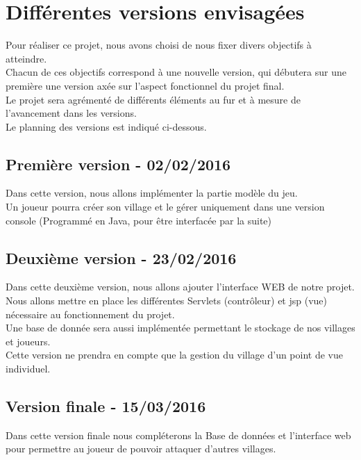 \chapter{Différentes versions envisagées}
	
	Pour réaliser ce projet, nous avons choisi de nous fixer divers objectifs à atteindre.\\
    Chacun de ces objectifs correspond à une nouvelle version, qui débutera sur une première une version axée sur l'aspect fonctionnel du projet final.\\
    Le projet sera agrémenté de différents éléments au fur et à mesure de l'avancement dans les versions.\\

    Le planning des versions est indiqué ci-dessous.
	
    \section{Première version - 02/02/2016}
    Dans cette version, nous allons implémenter la partie modèle du jeu.\\
    Un joueur pourra créer son village et le gérer uniquement dans une version console (Programmé en Java, pour être interfacée par la suite)
    
    \section{Deuxième version - 23/02/2016}
    Dans cette deuxième version, nous allons ajouter l'interface WEB de notre projet.\\
    Nous allons mettre en place les différentes Servlets (contrôleur) et jsp (vue) nécessaire au fonctionnement du projet.\\
    Une base de donnée sera aussi implémentée permettant le stockage de nos villages et joueurs.\\
    Cette version ne prendra en compte que la gestion du village d'un point de vue individuel.
    
    \section{Version finale - 15/03/2016}
    Dans cette version finale nous compléterons la Base de données et l'interface web pour permettre au joueur de pouvoir attaquer d'autres villages.
